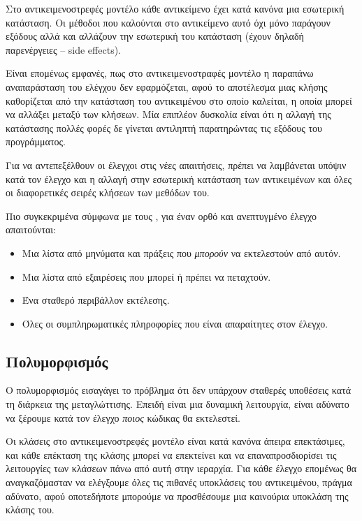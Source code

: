 \documentclass[12pt]{article}
\begin{document}
\par Στο αντικειμενοστρεφές μοντέλο κάθε αντικείμενο έχει κατά κανόνα μια εσωτερική κατάσταση. Οι μέθοδοι που καλούνται στο αντικείμενο αυτό όχι μόνο παράγουν εξόδους αλλά και αλλάζουν την εσωτερική του κατάσταση (έχουν δηλαδή παρενέργειες – side effects).

\par Είναι επομένως εμφανές, πως στο αντικειμενοστραφές μοντέλο η παραπάνω αναπαράσταση του ελέγχου δεν εφαρμόζεται, αφού το αποτέλεσμα μιας κλήσης καθορίζεται από την κατάσταση του αντικειμένου στο οποίο καλείται, η οποία μπορεί να αλλάξει μεταξύ των κλήσεων. Μία επιπλέον δυσκολία είναι ότι η αλλαγή της κατάστασης πολλές φορές δε γίνεται αντιληπτή παρατηρώντας τις εξόδους του προγράμματος.

\par Για να αντεπεξέλθουν οι έλεγχοι στις νέες απαιτήσεις, πρέπει να λαμβάνεται υπόψιν κατά τον έλεγχο και η αλλαγή στην εσωτερική κατάσταση των αντικειμένων και όλες οι διαφορετικές σειρές κλήσεων των μεθόδων του.

\par Πιο συγκεκριμένα σύμφωνα με τους \textcite{gordon}, για έναν ορθό και ανεπτυγμένο έλεγχο απαιτούνται:

\begin{itemize}
\item Μια λίστα από μηνύματα και πράξεις που \textit{μπορούν} να εκτελεστούν από αυτόν.
\item Μια λίστα από εξαιρέσεις που μπορεί ή πρέπει να πεταχτούν.
\item Ένα σταθερό περιβάλλον εκτέλεσης.
\item Όλες οι συμπληρωματικές πληροφορίες που είναι απαραίτητες στον έλεγχο.
\end{itemize}

\subsection{Πολυμορφισμός}

\par Ο πολυμορφισμός εισαγάγει το πρόβλημα ότι δεν υπάρχουν σταθερές υποθέσεις κατά τη διάρκεια της μεταγλώττισης. Επειδή είναι μια δυναμική λειτουργία, είναι αδύνατο να ξέρουμε κατά τον έλεγχο \textit{ποιος} κώδικας θα εκτελεστεί.

\par Οι κλάσεις στο αντικειμενοστρεφές μοντέλο είναι κατά κανόνα άπειρα επεκτάσιμες, και κάθε επέκταση της κλάσης μπορεί να επεκτείνει και να επαναπροσδιορίσει τις λειτουργίες των κλάσεων πάνω από αυτή στην ιεραρχία. Για κάθε έλεγχο επομένως θα αναγκαζόμασταν να ελέγξουμε όλες τις πιθανές υποκλάσεις του αντικειμένου, πράγμα αδύνατο, αφού οποτεδήποτε μπορούμε να προσθέσουμε μια καινούρια υποκλάση της κλάσης του.
\end{document}
